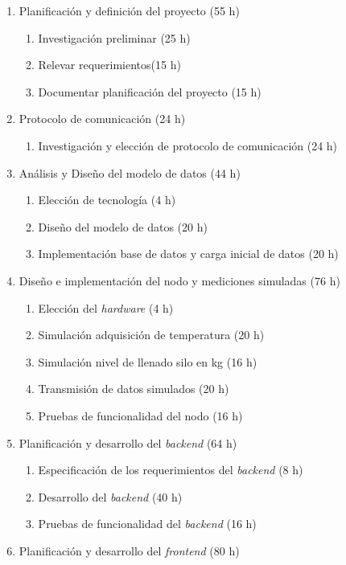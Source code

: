 \documentclass[
11pt, %
]{charter}
\begin{document}
\begin{enumerate}
\item Planificación y definición del proyecto (55 h)
	\begin{enumerate}
	\item Investigación preliminar (25 h)
	\item Relevar requerimientos(15 h)
	\item Documentar planificación del proyecto (15 h)
	\end{enumerate}
\item Protocolo de comunicación (24 h)
	\begin{enumerate}
	\item Investigación y elección de protocolo de comunicación (24 h)
	\end{enumerate}
\item Análisis y Diseño del modelo de datos (44 h)
	\begin{enumerate}
	\item Elección de tecnología (4 h)
	\item Diseño del modelo de datos (20 h)
	\item Implementación base de datos y carga inicial de datos (20 h)
	\end{enumerate}
\item Diseño e implementación del nodo y mediciones simuladas (76 h)
	\begin{enumerate}
	\item Elección del \textit{hardware} (4 h)
	\item Simulación adquisición de temperatura (20 h)
	\item Simulación nivel de llenado silo en kg (16 h)
	\item Transmisión de datos simulados (20 h)
	\item Pruebas de funcionalidad del nodo (16 h)
	\end{enumerate}	
\item Planificación y desarrollo del \textit{backend} (64 h)
	\begin{enumerate}
	\item Especificación de los requerimientos del \textit{backend} (8 h)
	\item Desarrollo del \textit{backend} (40 h)
	\item Pruebas de funcionalidad del \textit{backend} (16 h)
	\end{enumerate}
\item Planificación y desarrollo del \textit{frontend} (80 h)
	\begin{enumerate}

\end{enumerate}
\end{enumerate}
\end{document}
